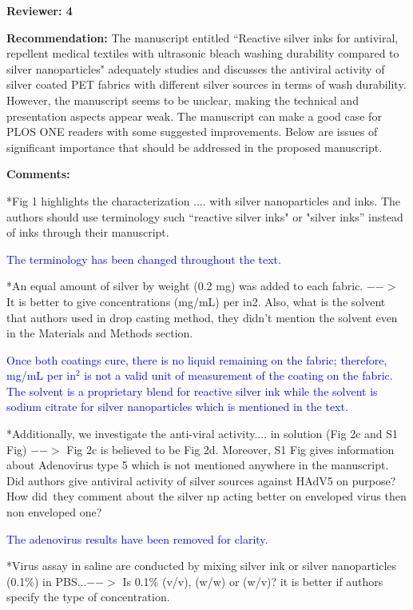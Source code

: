 \documentclass[12pt]{letter}
\newcommand{\blue}[1]{\textcolor{blue}{#1}} %
\begin{document}
\newpage
\textbf{Reviewer: 4}

\textbf{Recommendation:} 
The manuscript entitled ``Reactive silver inks for antiviral, repellent medical textiles with ultrasonic bleach washing durability compared to silver nanoparticles" adequately studies and discusses the antiviral activity of silver coated PET fabrics with different silver sources in terms of wash durability. However, the manuscript seems to be unclear, making the technical and presentation aspects appear weak. The manuscript can make a good case for PLOS ONE readers with some suggested improvements. Below are issues of significant importance that should be addressed in the proposed manuscript.

\textbf{Comments:} 

*Fig 1 highlights the characterization .... with silver nanoparticles and inks. The authors should use terminology such ``reactive silver inks" or "silver inks” instead of inks through their manuscript.

\blue{The terminology has been changed throughout the text. }

*An equal amount of silver by weight (0.2 mg) was added to each fabric. $-->$ It is better to give concentrations (mg/mL) per in2. Also, what is the solvent that authors used in drop casting method, they didn't mention the solvent even in the Materials and Methods section.

\blue{Once both coatings cure, there is no liquid remaining on the fabric; therefore, mg/mL per in$^2$ is not a valid unit of measurement of the coating on the fabric. The solvent is a proprietary blend for reactive silver ink while the solvent is sodium citrate for silver nanoparticles which is mentioned in the text. }

*Additionally, we investigate the anti-viral activity.... in solution (Fig 2c and S1 Fig) $-->$ Fig 2c is believed to be Fig 2d. Moreover, S1 Fig gives information about Adenovirus type 5 which is not mentioned anywhere in the manuscript. Did authors give antiviral activity of silver sources against HAdV5 on purpose? How did\ they comment about the silver np acting better on enveloped virus then non enveloped one?

\blue{The adenovirus results have been removed for clarity. }

*Virus assay in saline are conducted by mixing silver ink or silver nanoparticles (0.1\%) in PBS...$-->$ Is 0.1\% (v/v), (w/w) or (w/v)? it is better if authors specify the type of concentration.
\end{document}
